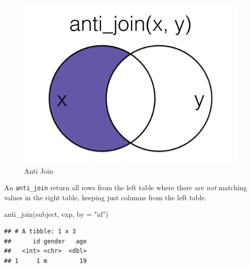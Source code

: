 \documentclass[
  oneside]{book}
\newenvironment{Shaded}{\begin{snugshade}}{\end{snugshade}}
\newcommand{\AttributeTok}[1]{\textcolor[rgb]{0.77,0.63,0.00}{#1}}
\newcommand{\FunctionTok}[1]{\textcolor[rgb]{0.00,0.00,0.00}{#1}}
\newcommand{\NormalTok}[1]{#1}
\newcommand{\StringTok}[1]{\textcolor[rgb]{0.31,0.60,0.02}{#1}}
\begin{document}
\begin{figure}

{\centering \includegraphics[width=1\linewidth]{images/joins/anti_join} 

}

\caption{Anti Join}\label{fig:img-anti-join}
\end{figure}

An \texttt{anti\_join} return all rows from the left table where there are \emph{not} matching values in the right table, keeping just columns from the left table.

\begin{Shaded}
\begin{Highlighting}[]
\FunctionTok{anti\_join}\NormalTok{(subject, exp, }\AttributeTok{by =} \StringTok{"id"}\NormalTok{)}
\end{Highlighting}
\end{Shaded}

\begin{verbatim}
## # A tibble: 1 x 3
##      id gender   age
##   <int> <chr>  <dbl>
## 1     1 m         19
\end{verbatim}
\end{document}
